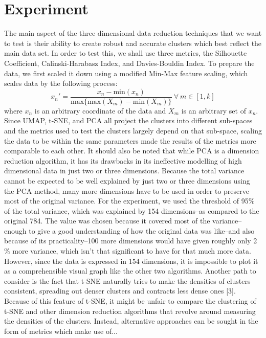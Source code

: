 \documentclass[11pt]{article}
\theoremstyle{definition}
\begin{document}
\section{Experiment}
The main aspect of the three dimensional data reduction techniques that we want to test is their ability to create robust and accurate clusters which best reflect the main data set. In order to test this, we shall use three metrics, the Silhouette Coefficient, Calinski-Harabasz Index, and Davies-Bouldin Index.
To prepare the data, we first scaled it down using a modified Min-Max feature scaling, which scales data by the following process:
$$x_n'=\frac{x_n-\text{min}(x_n)}{\text{max}\{\text{max}(X_m)-\text{min}(X_m)\}}\ \forall \ m \in [1,k]$$
where $x_n$ is an arbitrary coordinate of the data and $X_m$ is an arbitrary set of $x_n$. Since UMAP, t-SNE, and PCA all project the clusters into different sub-spaces and the metrics used to test the clusters largely depend on that sub-space, scaling the data to be within the same parameters made the results of the metrics more comparable to each other. \newline
It should also be noted that while PCA is a dimension reduction algorithm, it has its drawbacks in its ineffective modelling of high dimensional data in just two or three dimensions. Because the total variance cannot be expected to be well explained by just two or three dimensions using the PCA method, many more dimensions have to be used in order to preserve most of the original variance. For the experiment, we used the threshold of 95$\%$ of the total variance, which was explained by 154 dimensions--as compared to the original 784. The value was chosen because it covered most of the variance--enough to give a good understanding of how the original data was like--and also because of its practicality--100 more dimensions would have given roughly only 2$\%$ more variance, which isn't that significant to have for that much more data. However, since the data is expressed in 154 dimensions, it is impossible to plot it as a comprehensible visual graph like the other two algorithms. 
\newline
Another path to consider is the fact that t-SNE naturally tries to make the densities of clusters consistent, spreading out denser clusters and contracts less dense ones [3]. Because of this feature of t-SNE, it might be unfair to compare the clustering of t-SNE and other dimension reduction algorithms that revolve around measuring the densities of the clusters. Instead, alternative approaches can be sought in the form of metrics which make use of...
\end{document}
